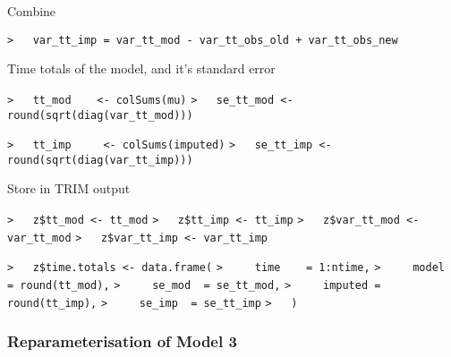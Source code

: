 \documentclass[a4paper]{article}
\begin{document}
Combine\par
\verb~>   var_tt_imp = var_tt_mod - var_tt_obs_old + var_tt_obs_new~\par

Time totals of the model, and it's standard error\par
\verb~>   tt_mod    <- colSums(mu)~\newline
\verb~>   se_tt_mod <- round(sqrt(diag(var_tt_mod)))~\par

\verb~>   tt_imp     <- colSums(imputed)~\newline
\verb~>   se_tt_imp <- round(sqrt(diag(var_tt_imp)))~\par

Store in TRIM output\par
\verb~>   z$tt_mod <- tt_mod~\newline
\verb~>   z$tt_imp <- tt_imp~\newline
\verb~>   z$var_tt_mod <- var_tt_mod~\newline
\verb~>   z$var_tt_imp <- var_tt_imp~\par

\verb~>   z$time.totals <- data.frame(~\newline
\verb~>     time    = 1:ntime,~\newline
\verb~>     model   = round(tt_mod),~\newline
\verb~>     se_mod  = se_tt_mod,~\newline
\verb~>     imputed = round(tt_imp),~\newline
\verb~>     se_imp  = se_tt_imp~\newline
\verb~>   )~\par





\subsubsection{Reparameterisation of Model 3}\par
\end{document}
